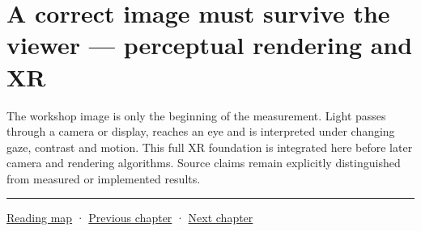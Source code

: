 \section{A correct image must survive the viewer --- perceptual rendering and XR}\label{04-visual-computing-ii-ch041-a-correct-image-must-survive-the-viewer-perceptual-rendering-and-xr}

The workshop image is only the beginning of the measurement. Light passes through a camera or display, reaches an eye and is interpreted under changing gaze, contrast and motion. This full XR foundation is integrated here before later camera and rendering algorithms. Source claims remain explicitly distinguished from measured or implemented results.

\begin{center}\rule{0.5\linewidth}{0.5pt}\end{center}

\hyperref[volume-reading-map]{Reading map} · \hyperref[04-visual-computing-ii-ch040-lighting-reconstruction-and-surface-motion]{Previous chapter} · \hyperref[04-visual-computing-ii-ch042-xr-radiometry-optics-and-perception]{Next chapter}
